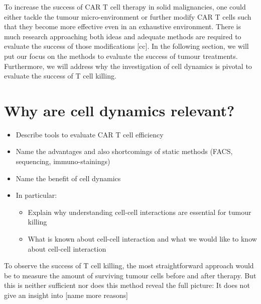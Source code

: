 \documentclass{report}
\begin{document}
To increase the success of CAR T cell therapy in solid malignancies, one could either tackle the tumour micro-environment or further modify CAR T cells such that they become more effective even in an exhaustive environment. There is much research approaching both ideas and adequate methods are required to evaluate the success of those modifications [cc]. In the following section, we will put our focus on the methods to evaluate the success of tumour treatments. Furthermore, we will address why the investigation of cell dynamics is pivotal to evaluate the success of T cell killing.


\section{Why are cell dynamics relevant?}

\begin{itemize}
	\item Describe tools to evaluate CAR T cell efficiency
	\item Name the advantages and also shortcomings of static methods (FACS, sequencing, immuno-stainings)
	\item Name the benefit of cell dynamics
	\item In particular:
		\begin{itemize}
	\item Explain why understanding cell-cell interactions are essential for tumour killing
	\item What is known about cell-cell interaction and what we would like to know about cell-cell interaction
\end{itemize}

\end{itemize}

To observe the success of T cell killing, the most straightforward approach would be to measure the amount of surviving tumour cells before and after therapy. But this is neither sufficient nor does this method reveal the full picture: It does not give an insight into [name more reasons]\\
\end{document}
